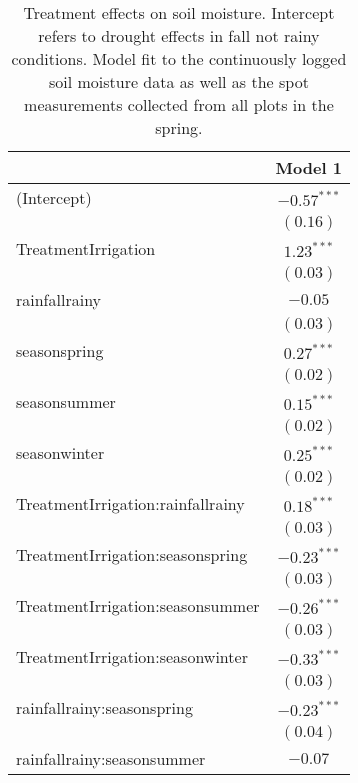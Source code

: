 
\begin{table}
\caption{Treatment effects on soil moisture. Intercept refers to drought effects in fall not rainy conditions.  Model fit to the continuously logged soil moisture data as well as the spot measurements collected from all plots in the spring.}
\begin{center}
\begin{tabular}{l c }
\hline
 & Model 1 \\
\hline
(Intercept)                       & $-0.57^{***}$ \\
                                  & $(0.16)$      \\
TreatmentIrrigation               & $1.23^{***}$  \\
                                  & $(0.03)$      \\
rainfallrainy                     & $-0.05$       \\
                                  & $(0.03)$      \\
seasonspring                      & $0.27^{***}$  \\
                                  & $(0.02)$      \\
seasonsummer                      & $0.15^{***}$  \\
                                  & $(0.02)$      \\
seasonwinter                      & $0.25^{***}$  \\
                                  & $(0.02)$      \\
TreatmentIrrigation:rainfallrainy & $0.18^{***}$  \\
                                  & $(0.03)$      \\
TreatmentIrrigation:seasonspring  & $-0.23^{***}$ \\
                                  & $(0.03)$      \\
TreatmentIrrigation:seasonsummer  & $-0.26^{***}$ \\
                                  & $(0.03)$      \\
TreatmentIrrigation:seasonwinter  & $-0.33^{***}$ \\
                                  & $(0.03)$      \\
rainfallrainy:seasonspring        & $-0.23^{***}$ \\
                                  & $(0.04)$      \\
rainfallrainy:seasonsummer        & $-0.07$       \\

\end{tabular}
\end{center}
\end{table}
